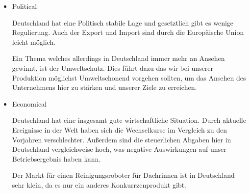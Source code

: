         \begin{itemize}
            \item Political
            
                Deutschland hat eine Politisch stabile Lage und gesetztlich gibt es wenige Regulierung. Auch der Export
                und Import sind durch die Europäische Union leicht möglich.

                Ein Thema welches allerdings in Deutschland immer mehr an Ansehen gewinnt, ist der Umweltschutz. Dies 
                führt dazu das wir bei unserer Produktion möglichst Umweltschonend vorgehen sollten, um das Ansehen des
                Unternehmens hier zu stärken und unserer Ziele  zu erreichen.

            \item Economical
            
                Deutschland hat eine insgesamt gute wirtschaftliche Situation. Durch aktuelle Ereignisse in der Welt 
                haben sich die Wechselkurse im Vergleich zu den Vorjahren verschlechter. Außerdem sind die steuerlichen 
                Abgaben hier in Deutschland vergleichweise hoch, was negative Auswirkungen auf unser Betriebsergebnis
                haben kann.

                Der Markt für einen Reinigungsroboter für Dachrinnen ist in Deutschland sehr klein, da es nur ein 
                anderes Konkurrzenprodukt gibt.
        \end{itemize}